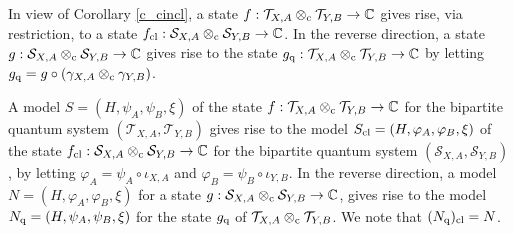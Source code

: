 \documentclass[11pt]{amsart}
\theoremstyle{definition}
\newcommand\nph{\varphi}
\newcommand{\cl}[1]{\mathcal{#1}}
\newcommand{\bb}[1]{\mathbb{#1}}
\begin{document}





In view of Corollary \ref{c_cincl}, a state 
$f : \cl T_{X,A}\otimes_{\rm c}\cl T_{Y,B}\to \bb{C}$
gives rise, via restriction, to a state 
$f_{\rm cl} : \cl S_{X,A}\otimes_{\rm c} \cl S_{Y,B}\to \bb{C}$. 
In the reverse direction, a state
$g : \cl S_{X,A}\otimes_{\rm c} \cl S_{Y,B}\to \bb{C}$
gives rise to the state 
$g_{\rm q} : \cl T_{X,A}\otimes_{\rm c}\cl T_{Y,B}\to \bb{C}$
by letting $g_{\rm q} = g\circ (\gamma_{X,A}\otimes_{\rm c} \gamma_{Y,B})$. 

A model $S = (H,\psi_A,\psi_B,\xi)$ of the state
$f : \cl T_{X,A}\otimes_{\rm c}\cl T_{Y,B}\to \bb{C}$
for the bipartite quantum system $(\cl T_{X,A},\cl T_{Y,B})$ gives rise to 
the model 
$S_{\rm cl} = (H,\nph_A,\nph_B,\xi)$ of the state
$f_{\rm cl} : \cl S_{X,A}\otimes_{\rm c} \cl S_{Y,B}\to \bb{C}$
for the bipartite quantum system $(\cl S_{X,A},\cl S_{Y,B})$, by 
letting $\nph_A = \psi_A\circ \iota_{X,A}$ and $\nph_B = \psi_B\circ \iota_{Y,B}$. 
In the reverse direction, a model 
$N = (H,\nph_A,\nph_B,\xi)$ for a state 
$g : \cl S_{X,A}\otimes_{\rm c} \cl S_{Y,B}\to \bb{C}$, 
gives rise to the model 
$N_{\rm q} = (H,\psi_A,\psi_B,\xi)$ for the state
$g_{\rm q}$ of $\cl T_{X,A}\otimes_{\rm c} \cl T_{Y,B}$.
We note that $(N_{\rm q})_{\rm cl} = N$. 
\end{document}
